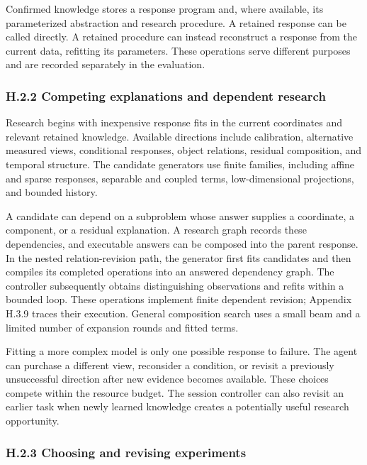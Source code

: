 \documentclass[11pt,a4paper]{article}
\begin{document}
Confirmed knowledge stores a response program and, where available, its parameterized abstraction and research procedure. A retained response can be called directly. A retained procedure can instead reconstruct a response from the current data, refitting its parameters. These operations serve different purposes and are recorded separately in the evaluation.


\subsubsection*{H.2.2 Competing explanations and dependent research}

Research begins with inexpensive response fits in the current coordinates and relevant retained knowledge. Available directions include calibration, alternative measured views, conditional responses, object relations, residual composition, and temporal structure. The candidate generators use finite families, including affine and sparse responses, separable and coupled terms, low-dimensional projections, and bounded history.


A candidate can depend on a subproblem whose answer supplies a coordinate, a component, or a residual explanation. A research graph records these dependencies, and executable answers can be composed into the parent response. In the nested relation-revision path, the generator first fits candidates and then compiles its completed operations into an answered dependency graph. The controller subsequently obtains distinguishing observations and refits within a bounded loop. These operations implement finite dependent revision; Appendix H.3.9 traces their execution. General composition search uses a small beam and a limited number of expansion rounds and fitted terms.


Fitting a more complex model is only one possible response to failure. The agent can purchase a different view, reconsider a condition, or revisit a previously unsuccessful direction after new evidence becomes available. These choices compete within the resource budget. The session controller can also revisit an earlier task when newly learned knowledge creates a potentially useful research opportunity.


\subsubsection*{H.2.3 Choosing and revising experiments}
\end{document}

